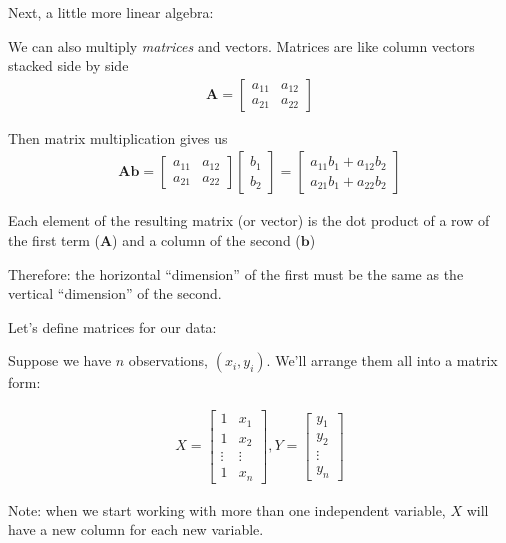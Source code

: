 \documentclass[aspectratio=169]{beamer}
\begin{document}
\begin{frame}{Next, a little more linear algebra:}

We can also multiply \textit{matrices} and vectors.  Matrices are like column vectors stacked side by side
\begin{align*}
\mathbf{A} =  
\begin{bmatrix} 
	a_{11} &a_{12}\\
	a_{21} &a_{22}
\end{bmatrix}
\end{align*}

Then matrix multiplication gives us
\begin{align*}
\mathbf{A}\mathbf{b} = 
\begin{bmatrix} 
	a_{11} &a_{12}\\
	a_{21} &a_{22}
\end{bmatrix}
\begin{bmatrix}
	b_1\\
	b_2
\end{bmatrix} 
=\begin{bmatrix}
	a_{11}b_1+a_{12}b_2 \\
	a_{21}b_1+a_{22}b_2  
\end{bmatrix} 
\end{align*}

\pause
Each element of the resulting matrix (or vector) is the dot product of a row of the first term ($\mathbf{A}$) and a column of the second ($\mathbf{b}$)

\vspace{5mm}
Therefore:   the horizontal ``dimension'' of the first must be the same as the vertical ``dimension'' of the second.

\end{frame}

\begin{frame}{Let's define matrices for our data:}


Suppose we have $n$ observations, $(x_i, y_i)$.  We'll arrange them all into a matrix form:

\begin{align*}
X = \begin{bmatrix} 
  1 & x_1\\
  1 & x_2\\
  \vdots & \vdots \\
  1 & x_n 
\end{bmatrix}, 
Y = 
\begin{bmatrix} 
  y_1\\
  y_2\\
   \vdots \\
  y_n 
\end{bmatrix} 
\end{align*}

Note: when we start working with more than one independent variable, $X$ will have a new column for each new variable.  

\end{frame}
\end{document}
